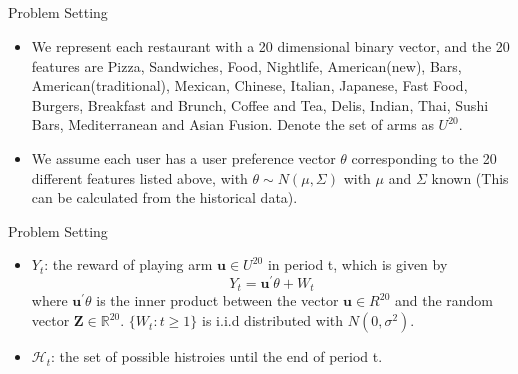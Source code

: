 \documentclass[serif]{beamer}
\begin{document}
\tableofcontents[currentsection,subsectionstyle=hide]

\subsection*{}

\begin{frame}{Problem Setting}
\begin{itemize}
\item<1-> We represent each restaurant with a 20 dimensional binary vector, and the 20 features are Pizza, Sandwiches, Food, Nightlife, American(new), Bars, American(traditional), Mexican, Chinese, Italian, Japanese, Fast Food, Burgers, Breakfast and Brunch, Coffee and Tea, Delis, Indian, Thai, Sushi Bars, Mediterranean and Asian Fusion. Denote the set of arms as $U^{20}$.
\item<2-> We assume each user has a user preference vector $\theta$ corresponding to the 20 different features listed above, with $\theta\sim N(\mu,\Sigma)$ with $\mu$ and $\Sigma$ known (This can be calculated from the historical data).
\end{itemize}
\end{frame}
\begin{frame}{Problem Setting}
\begin{itemize}
\item<1-> $Y_{t}$: the reward of playing arm $\textbf{u}\in U^{20}$ in period t, which is given by
\begin{equation}
Y_{t}=\textbf{u}^{'}\theta+W_{t} \nonumber 
\end{equation}
where $\textbf{u}^{'}\theta$ is the inner product between the vector $\textbf{u}\in R^{20}$ and the random vector $\textbf{Z}\in \mathbb{R}^{20}$. $\{W_{t}:t\geq 1\}$ is i.i.d distributed with $N(0,\sigma^{2})$.
\item<2-> $\mathscr{H}_{t}$: the set of possible histroies until the end of period t.
\end{itemize}

\end{frame}
\end{document}
